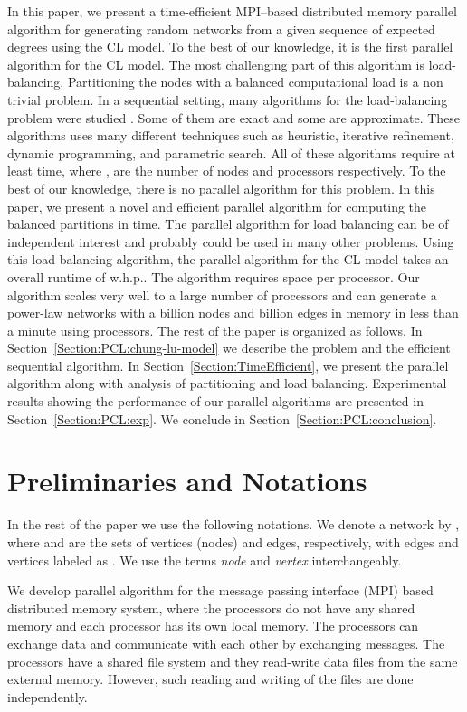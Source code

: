 \documentclass[conference,letterpaper,10pt]{IEEEtran}
\begin{document}
In this paper, we present a time-efficient  MPI--based distributed memory parallel algorithm for generating random networks from a given sequence of expected degrees using the CL model. To the best of our knowledge, it is the first parallel algorithm for the CL model. The most challenging part of this algorithm is load-balancing. Partitioning the nodes with a balanced computational load is a non trivial problem. In a sequential setting, many algorithms for the load-balancing problem were studied \cite{Manne1995,Olstad1995,Pinar2004}. 
Some of them are exact and some are approximate. 
These algorithms uses many different techniques such as heuristic, iterative refinement, dynamic programming, and parametric search. All of these algorithms require at least  time, where ,  are the number of nodes and processors respectively.  To the best of our knowledge, there is no parallel algorithm for this problem. In this paper, we present a novel and efficient parallel algorithm for computing the balanced partitions in  time. The parallel algorithm for load balancing can be of independent interest and probably could be used in many other problems. Using this load balancing algorithm, the parallel algorithm for the CL model takes an overall runtime of  {w.h.p.}. The algorithm requires  space per processor. Our algorithm scales very well to a large number of processors and can generate a power-law networks with a billion nodes and  billion edges in memory in less than a minute using  processors.
The rest of the paper is organized as follows. 
In Section~\ref{Section:PCL:chung-lu-model} we describe the problem and the efficient sequential algorithm. 
In Section~\ref{Section:TimeEfficient}, we present the parallel algorithm along with analysis of partitioning and load balancing. 
Experimental results showing the performance of our parallel algorithms are presented in Section~\ref{Section:PCL:exp}. We conclude in Section~\ref{Section:PCL:conclusion}.

\section{Preliminaries and Notations} \label{Section:PCL:prelim}
In the rest of the paper we use the following notations. We denote a network by , where  and  are the sets of vertices (nodes) and edges, respectively, with  edges and  vertices labeled as . We use the terms \emph{node} and \emph{vertex} interchangeably. 

We develop parallel algorithm for the message passing interface (MPI) based distributed memory system, where the processors do not have any shared memory and each processor has its own local memory. The processors can exchange data and communicate with each other by exchanging messages. The processors have a shared file system and they read-write data files from the same external memory. However, such reading and writing of the files are done independently.
\end{document}
